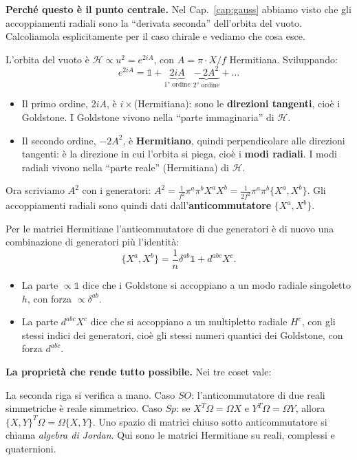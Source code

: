 \documentclass[11pt,a4paper]{article}
\numberwithin{equation}{section}
\theoremstyle{remark}
\newcommand{\Hf}{\mathcal{H}}
\newcommand{\one}{\mathbb{1}}
\begin{document}
\textbf{Perché questo è il punto centrale.} Nel Cap.~\ref{cap:gauss} abbiamo visto che gli accoppiamenti radiali sono la ``derivata seconda'' dell'orbita del vuoto. Calcoliamola esplicitamente per il caso chirale e vediamo che cosa esce.

L'orbita del vuoto è $\Hf\propto u^2=e^{2iA}$, con $A=\pi\cdot X/f$ Hermitiana. Sviluppando:
\[
e^{2iA}=\one+\underbrace{2iA}_{\text{1° ordine}}\;\underbrace{-\,2A^2}_{\text{2° ordine}}+\dots
\]
\begin{itemize}
\item Il primo ordine, $2iA$, è $i\times$(Hermitiana): sono le \textbf{direzioni tangenti}, cioè i Goldstone. I Goldstone vivono nella ``parte immaginaria'' di $\Hf$.
\item Il secondo ordine, $-2A^2$, è \textbf{Hermitiano}, quindi perpendicolare alle direzioni tangenti: è la direzione in cui l'orbita si piega, cioè i \textbf{modi radiali}. I modi radiali vivono nella ``parte reale'' (Hermitiana) di $\Hf$.
\end{itemize}
Ora scriviamo $A^2$ con i generatori: $A^2=\frac{1}{f^2}\pi^a\pi^bX^aX^b=\frac{1}{2f^2}\pi^a\pi^b\{X^a,X^b\}$. Gli accoppiamenti radiali sono quindi dati dall'\textbf{anticommutatore} $\{X^a,X^b\}$.

Per le matrici Hermitiane l'anticommutatore di due generatori è di nuovo una combinazione di generatori più l'identità:
\begin{equation}
\{X^a,X^b\}=\frac1n\delta^{ab}\one+d^{abc}X^c .
\label{eq:jordan}
\end{equation}
\begin{itemize}
\item La parte $\propto\one$ dice che i Goldstone si accoppiano a un modo radiale singoletto $h$, con forza $\propto\delta^{ab}$.
\item La parte $d^{abc}X^c$ dice che si accoppiano a un multipletto radiale $H^c$, con gli stessi indici dei generatori, cioè gli stessi numeri quantici dei Goldstone, con forza $d^{abc}$.
\end{itemize}

\textbf{La proprietà che rende tutto possibile.} Nei tre coset vale:
\begin{center}
\end{center}
La seconda riga si verifica a mano. Caso $SO$: l'anticommutatore di due reali simmetriche è reale simmetrico. Caso $Sp$: se $X^T\Omega=\Omega X$ e $Y^T\Omega=\Omega Y$, allora $\{X,Y\}^T\Omega=\Omega\{X,Y\}$. Uno spazio di matrici chiuso sotto anticommutatore si chiama \emph{algebra di Jordan}. Qui sono le matrici Hermitiane su reali, complessi e quaternioni.
\end{document}
